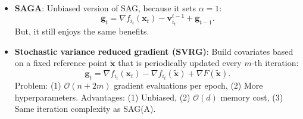 \documentclass[8pt,a4paper]{extarticle}
\newcommand{\lft}{\mathopen{}\mathclose\bgroup\left}
\newcommand{\rgt}{\aftergroup\egroup\right}
\newcommand{\E}{\mathbb{E}}
\renewcommand{\vec}[1]{\bm{#1}}
\newenvironment{topic}[1]
{\textbf{\sffamily \colorbox{black}{\rlap{\textbf{\textcolor{white}{#1}}}\hspace{\linewidth}\hspace{-2\fboxsep}}} \\ \vspace{0.2cm}}
{}
\begin{document}
\begin{multicols*}{2}
\begin{topic}{Variance reduction}
\begin{itemize}
\begin{itemize}
\[                                \vec{g}_t = \frac{1}{n} \sum_{i=1}^{n} \vec{v}_i^t.
                            \]
                            Each iteration we update $\vec{v}_i^t$ by \[
                                \vec{v}_i^t =
                                \begin{cases}
                                    \nabla f_{i_t}(\vec{x}_t) & i = i_t     \\
                                    \vec{v}_i^{t-1}           & i \neq i_t.
                                \end{cases}
                            \]
                            Thus, we have $\alpha=\frac{1}{n}$, $Y = \vec{v}_{i_t}^{t-1}$, and $\E[Y] = \vec{g}_{t-1}$, \[
                                \vec{g}_t = \frac{1}{n} \lft( \nabla f_{i_t}(\vec{x}_t) - \vec{v}_{i_t}^{t-1} \rgt) + \vec{g}_{t-1}.
                            \]
                            Problem: (1) $\mathcal{O}(nd)$ storage, (2) biased $\alpha \neq 1$. Advantage:
                            $\mathcal{O}((n+\kappa_{\max} \log \frac{1}{\epsilon}))$ iteration complexity, where $\kappa_{\max}
                                = \max_{i \in [n]} \frac{L_i}{\mu}$.
                      \item \textbf{SAGA}: Unbiased version of SAG, because it sets $\alpha=1$: \[
                                \vec{g}_t = \nabla f_{i_t}(\vec{x}_t) - \vec{v}_{i_t}^{t-1} + \vec{g}_{t-1}.
                            \]
                            But, it still enjoys the same benefits.
                      \item \textbf{Stochastic variance reduced gradient (SVRG)}: Build covariates based on a fixed reference point $\tilde{\vec{x}}$ that is periodically updated every $m$-th iteration: \[
                                \vec{g}_t = \nabla f_{i_t}(\vec{x}_t) - \nabla f_{i_t}(\tilde{\vec{x}}) + \nabla F(\tilde{\vec{x}}).
                            \]
                            Problem: (1) $\mathcal{O}(n+2m)$ gradient evaluations per epoch, (2) More hyperparameters.
                            Advantages: (1) Unbiased, (2) $\mathcal{O}(d)$ memory cost, (3) Same iteration complexity as
                            SAG(A).
                  \end{itemize}
        \end{itemize}
    \end{topic}


\end{multicols*}
\end{document}
